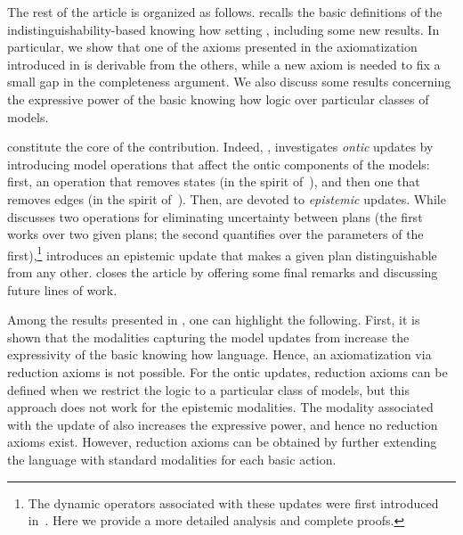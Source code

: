 \begin{mrevised}
The rest of the article is organized as follows.  recalls the basic definitions of the indistinguishability-based knowing how setting \cite{AFSVQ21,AFSVQ23report}, including some new results. In particular, we show that one of the axioms presented in the axiomatization introduced in \cite{AFSVQ21,AFSVQ23report} is derivable from the others, while a new axiom is needed to fix a small gap in the completeness argument. We also discuss some results concerning the expressive power of the basic knowing how logic over particular classes of models. 

 constitute the core of the contribution. Indeed, , investigates \emph{ontic} updates by introducing model operations that affect the ontic components of the models: first, an operation that removes states (in the spirit of~\cite{Plaza89:lopc}), and then one that removes edges (in the spirit of~\cite{KooiR11}). Then,  are devoted to \emph{epistemic} updates. While  discusses two operations for eliminating uncertainty between plans (the first works over two given plans; the second quantifies over the parameters of the first),\footnote{The dynamic operators associated with these updates were first introduced in~\cite{AFSV22}. Here we provide a more detailed analysis and complete proofs.} 
introduces an epistemic update that makes a given plan distinguishable from any other.  closes the article by offering some final remarks and discussing future lines of work.

Among the results presented in , one can highlight the following. First, it is  shown that the modalities capturing the model updates from  increase the expressivity of the basic knowing how language. Hence, an axiomatization via reduction axioms is not possible. For the ontic updates, reduction axioms can be defined when we restrict the logic to a particular class of models, but this approach does not work for the epistemic modalities. The modality associated with the update of  also increases the expressive power, and hence no reduction axioms exist. However, reduction axioms can be obtained by further extending the language with standard modalities for each basic action. 
 
\end{mrevised}
